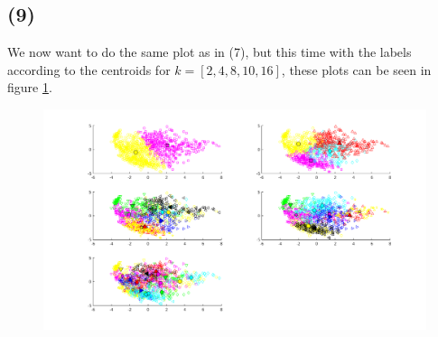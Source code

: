 \documentclass[a4paper]{article}
\begin{document}
\subsection*{(9)}
We now want to do the same plot as in (7), but this time with the labels according to the centroids for $k=[2,4,8,10,16]$, these plots can be seen in figure \ref{opg59}.
\begin{figure}[H]
  \centering
  \includegraphics[width=\textwidth]{./59.png}
  \caption{}
  \label{opg59}
\end{figure}
\end{document}
